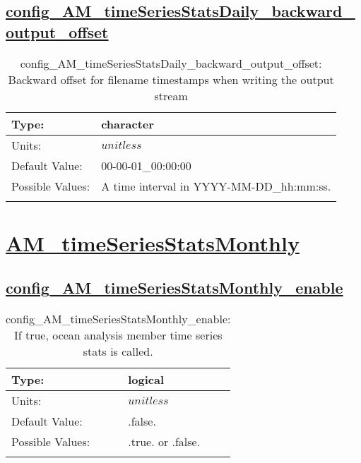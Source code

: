 \subsection[config\_AM\_timeSeriesStatsDaily\_backward\_output\_offset]{\hyperref[sec:nm_tab_AM_timeSeriesStatsDaily]{config\_AM\_timeSeriesStatsDaily\_backward\_output\_offset}}
\label{subsec:nm_sec_config_AM_timeSeriesStatsDaily_backward_output_offset}
\begin{center}
\begin{longtable}{| p{2.0in} || p{4.0in} |}
    \hline
    Type: & character \\
    \hline
    Units: & $unitless$ \\
    \hline
    Default Value: & 00-00-01\_00:00:00 \\
    \hline
    Possible Values: & A time interval in YYYY-MM-DD\_hh:mm:ss. \\
    \hline
    \caption{config\_AM\_timeSeriesStatsDaily\_backward\_output\_offset: Backward offset for filename timestamps when writing the output stream}
\end{longtable}
\end{center}
\section[AM\_timeSeriesStatsMonthly]{\hyperref[sec:nm_tab_AM_timeSeriesStatsMonthly]{AM\_timeSeriesStatsMonthly}}
\label{sec:nm_sec_AM_timeSeriesStatsMonthly}
\subsection[config\_AM\_timeSeriesStatsMonthly\_enable]{\hyperref[sec:nm_tab_AM_timeSeriesStatsMonthly]{config\_AM\_timeSeriesStatsMonthly\_enable}}
\label{subsec:nm_sec_config_AM_timeSeriesStatsMonthly_enable}
\begin{center}
\begin{longtable}{| p{2.0in} || p{4.0in} |}
    \hline
    Type: & logical \\
    \hline
    Units: & $unitless$ \\
    \hline
    Default Value: & .false. \\
    \hline
    Possible Values: & .true. or .false. \\
    \hline
    \caption{config\_AM\_timeSeriesStatsMonthly\_enable: If true, ocean analysis member time series stats is called.}
\end{longtable}
\end{center}

